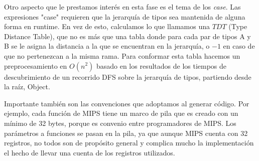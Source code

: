 \documentclass[a4paper, 12pt]{article}
\begin{document}
\begin{itemize}
Otro aspecto que le prestamos inter\'es en esta fase es el tema de los \textit{case}. Las expresiones "case"
requieren que la jerarqu\'ia de tipos sea mantenida de alguna forma en runtime. En vez de esto, calculamos 
lo que llamamos una $TDT$ (Type Distance Table), que no es m\'as que una tabla donde para cada par de tipos
A y B se le asigna la distancia a la que se encuentran en la jerarqu\'ia, o $-1$ en caso de que no pertenezcan
a la misma rama. Para conformar esta tabla hacemos un preprocesamiento en $O(n^2)$ basado en los resultados 
de los tiempos de descubrimiento de un recorrido DFS sobre la jerarqu\'ia de tipos, partiendo desde la ra\'iz,
Object.

Importante tambi\'en son las convenciones que adoptamos al generar c\'odigo. Por ejemplo, cada funci\'on
de MIPS tiene un marco de pila que es creado con un m\'inimo de 32 bytes, porque es convenio entre programadores
de MIPS. Los par\'ametros a funciones se pasan en la pila, ya que aunque MIPS cuenta con 32 registros, no todos
son de prop\'osito general y complica mucho la implementaci\'on el hecho de llevar una cuenta de los registros
utilizados.

\end{itemize}
\end{document}
